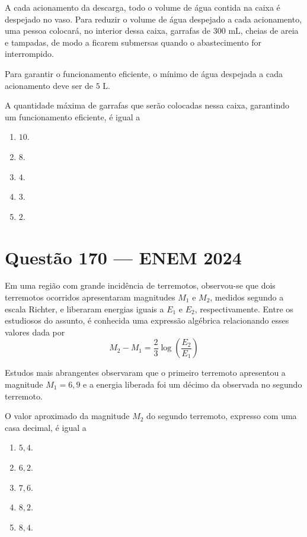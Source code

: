 \documentclass[11pt,a4paper]{article}
\begin{document}
\begin{center}
\begin{tikzpicture}[scale=1.0]
    \end{tikzpicture}
\end{center}

A cada acionamento da descarga, todo o volume de água contida na caixa é despejado no vaso. Para reduzir o volume de água despejado a cada acionamento, uma pessoa colocará, no interior dessa caixa, garrafas de $300\text{ mL}$, cheias de areia e tampadas, de modo a ficarem submersas quando o abastecimento for interrompido.

Para garantir o funcionamento eficiente, o mínimo de água despejada a cada acionamento deve ser de $5\text{ L}$.

A quantidade máxima de garrafas que serão colocadas nessa caixa, garantindo um funcionamento eficiente, é igual a

\begin{enumerate}[label=(\Alph*)]
    \item $10$.
    \item $8$.
    \item $4$.
    \item $3$.
    \item $2$.
\end{enumerate}


\section*{Questão 170 --- ENEM 2024}

Em uma região com grande incidência de terremotos, observou-se que dois terremotos ocorridos apresentaram magnitudes $M_1$ e $M_2$, medidos segundo a escala Richter, e liberaram energias iguais a $E_1$ e $E_2$, respectivamente. Entre os estudiosos do assunto, é conhecida uma expressão algébrica relacionando esses valores dada por
\[ M_2 - M_1 = \frac{2}{3} \log \left(\frac{E_2}{E_1}\right) \]

Estudos mais abrangentes observaram que o primeiro terremoto apresentou a magnitude $M_1 = 6{,}9$ e a energia liberada foi um décimo da observada no segundo terremoto.

O valor aproximado da magnitude $M_2$ do segundo terremoto, expresso com uma casa decimal, é igual a

\begin{enumerate}[label=(\Alph*)]
    \item $5{,}4$.
    \item $6{,}2$.
    \item $7{,}6$.
    \item $8{,}2$.
    \item $8{,}4$.
\end{enumerate}
\end{document}
